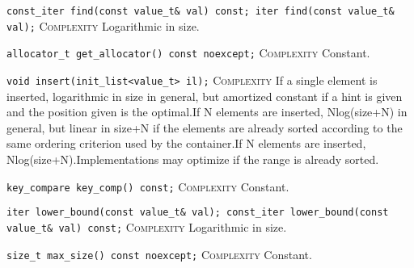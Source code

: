 \noindent{}\hspace*{0.25em}\lstinline[basicstyle=\ttfamily\color{clime}]{const_iter find(const value_t& val) const; iter find(const value_t& val);} \textsc{Complexity} Logarithmic in size.\\\vspace{-0.6em}

\noindent{}\hspace*{0.25em}\lstinline[basicstyle=\ttfamily\color{cgreen}]{allocator_t get_allocator() const noexcept;} \textsc{Complexity} Constant.\\\vspace{-0.6em}

\noindent{}\hspace*{0.25em}\lstinline[basicstyle=\ttfamily\color{corange}]{void insert(init_list<value_t> il);} \textsc{Complexity} If a single element is inserted, logarithmic in size in general, but amortized constant if a hint is given and the position given is the optimal.If N elements are inserted, Nlog(size+N) in general, but linear in size+N if the elements are already sorted according to the same ordering criterion used by the container.If N elements are inserted, Nlog(size+N).Implementations may optimize if the range is already sorted.\\\vspace{-0.6em}

\noindent{}\hspace*{0.25em}\lstinline[basicstyle=\ttfamily\color{cgreen}]{key_compare key_comp() const;} \textsc{Complexity} Constant.\\\vspace{-0.6em}

\noindent{}\hspace*{0.25em}\lstinline[basicstyle=\ttfamily\color{clime}]{iter lower_bound(const value_t& val); const_iter lower_bound(const value_t& val) const;} \textsc{Complexity} Logarithmic in size.\\\vspace{-0.6em}

\noindent{}\hspace*{0.25em}\lstinline[basicstyle=\ttfamily\color{cgreen}]{size_t max_size() const noexcept;} \textsc{Complexity} Constant.\\\vspace{-0.6em}

